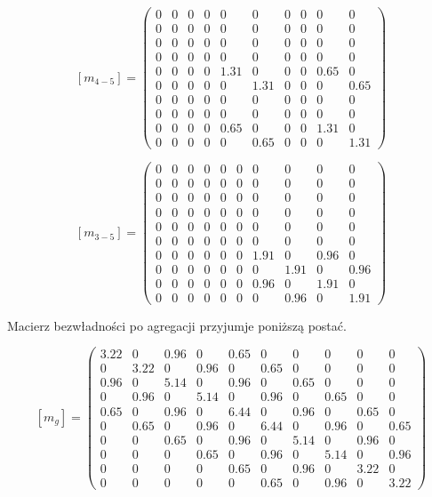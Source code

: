 \documentclass[12pt, a4papper, twoside]{article}
\begin{document}
$$ [m_{4-5}] = \left(\begin{array}{cccccccccc} 0 & 0 & 0 & 0 & 0 & 0 & 0 & 0 & 0 & 0\\ 0 & 0 & 0 & 0 & 0 & 0 & 0 & 0 & 0 & 0\\ 0 & 0 & 0 & 0 & 0 & 0 & 0 & 0 & 0 & 0\\ 0 & 0 & 0 & 0 & 0 & 0 & 0 & 0 & 0 & 0\\ 0 & 0 & 0 & 0 & 1.31 & 0 & 0 & 0 & 0.65 & 0\\ 0 & 0 & 0 & 0 & 0 & 1.31 & 0 & 0 & 0 & 0.65\\ 0 & 0 & 0 & 0 & 0 & 0 & 0 & 0 & 0 & 0\\ 0 & 0 & 0 & 0 & 0 & 0 & 0 & 0 & 0 & 0\\ 0 & 0 & 0 & 0 & 0.65 & 0 & 0 & 0 & 1.31 & 0\\ 0 & 0 & 0 & 0 & 0 & 0.65 & 0 & 0 & 0 & 1.31 \end{array}\right) $$

$$ [m_{3-5}] =\left(\begin{array}{cccccccccc} 0 & 0 & 0 & 0 & 0 & 0 & 0 & 0 & 0 & 0\\ 0 & 0 & 0 & 0 & 0 & 0 & 0 & 0 & 0 & 0\\ 0 & 0 & 0 & 0 & 0 & 0 & 0 & 0 & 0 & 0\\ 0 & 0 & 0 & 0 & 0 & 0 & 0 & 0 & 0 & 0\\ 0 & 0 & 0 & 0 & 0 & 0 & 0 & 0 & 0 & 0\\ 0 & 0 & 0 & 0 & 0 & 0 & 0 & 0 & 0 & 0\\ 0 & 0 & 0 & 0 & 0 & 0 & 1.91 & 0 & 0.96 & 0\\ 0 & 0 & 0 & 0 & 0 & 0 & 0 & 1.91 & 0 & 0.96\\ 0 & 0 & 0 & 0 & 0 & 0 & 0.96 & 0 & 1.91 & 0\\ 0 & 0 & 0 & 0 & 0 & 0 & 0 & 0.96 & 0 & 1.91 \end{array}\right) $$

Macierz bezwładności po agregacji przyjumje poniższą postać.

$$ [m_{g}] = \left(\begin{array}{cccccccccc} 3.22 & 0 & 0.96 & 0 & 0.65 & 0 & 0 & 0 & 0 & 0\\ 0 & 3.22 & 0 & 0.96 & 0 & 0.65 & 0 & 0 & 0 & 0\\ 0.96 & 0 & 5.14 & 0 & 0.96 & 0 & 0.65 & 0 & 0 & 0\\ 0 & 0.96 & 0 & 5.14 & 0 & 0.96 & 0 & 0.65 & 0 & 0\\ 0.65 & 0 & 0.96 & 0 & 6.44 & 0 & 0.96 & 0 & 0.65 & 0\\ 0 & 0.65 & 0 & 0.96 & 0 & 6.44 & 0 & 0.96 & 0 & 0.65\\ 0 & 0 & 0.65 & 0 & 0.96 & 0 & 5.14 & 0 & 0.96 & 0\\ 0 & 0 & 0 & 0.65 & 0 & 0.96 & 0 & 5.14 & 0 & 0.96\\ 0 & 0 & 0 & 0 & 0.65 & 0 & 0.96 & 0 & 3.22 & 0\\ 0 & 0 & 0 & 0 & 0 & 0.65 & 0 & 0.96 & 0 & 3.22 \end{array}\right) $$
\end{document}

